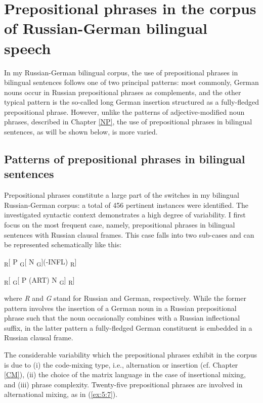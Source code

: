 \section{Prepositional phrases in the corpus of Russian-German bilingual speech}
In my Russian-German bilingual corpus, the use of prepositional phrases in bilingual sentences follows one of two principal patterns: most commonly, German nouns occur in Russian prepositional phrases as complements, and the other typical pattern is the so-called long German insertion structured as a fully-fledged prepositional phrase. However, unlike the patterns of adjective-modified noun phrases, described in Chapter \ref{NP}, the use of prepositional phrases in bilingual sentences, as will be shown below, is more varied.

\subsection{Patterns of prepositional phrases in bilingual sentences}
\label{sec:PP sample}

\noindent Prepositional phrases constitute a large part of the switches in my bilingual Russian-German corpus: a total of 456 pertinent instances were identified. The investigated syntactic context demonstrates a high degree of variability. I first focus on the most frequent case, namely, prepositional phrases in bilingual sentences with Russian clausal frames. This case falls into two sub-cases and can be represented schematically like this:

\ea
\label{ex:5:6}
\textsubscript{R}[ P \textsubscript{G}[ N \textsubscript{G}](-INFL) \textsubscript{R}]

\textsubscript{R}[ \textsubscript{G}[ P (ART) N \textsubscript{G}] \textsubscript{R}]
\z

\noindent where \textit{R} and \textit{G} stand for Russian and German, respectively. While the former pattern involves the insertion of a German noun in a Russian prepositional phrase such that the noun  occasionally combines with a Russian inflectional suffix, in the latter pattern a fully-fledged German constituent is embedded in a Russian clausal frame.

The considerable variability which the prepositional phrases exhibit in the corpus is due to (i) the code-mixing type, i.e., alternation or insertion (cf. Chapter \ref{CM}), (ii) the choice of the matrix language in the case of insertional mixing, and (iii) phrase complexity. Twenty-five prepositional phrases are involved in alternational mixing, as in (\ref{ex:5:7}).

